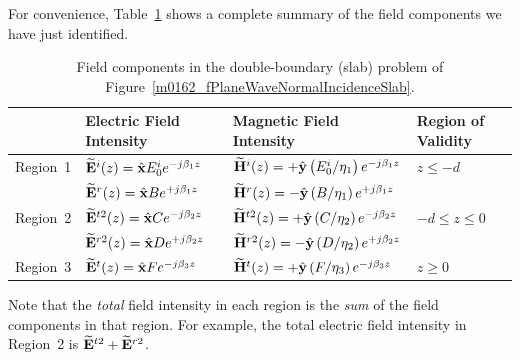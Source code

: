 For convenience, Table~\ref{m0162_tFieldComponents} shows a complete summary of the field components we have just identified. 
%
\begin{table}[t] %
\begin{center}
\begin{tabular}{llll}
         & Electric Field Intensity & Magnetic Field Intensity & Region of Validity \\
\hline\hline
Region~1 & $\widetilde{\bf E}^i(z)    = \hat{\bf x} E_0^i e^{-j\beta_1 z}$    &  $\widetilde{\bf H}^i(z)    = +\hat{\bf y} \left(E_0^i/\eta_1\right) e^{-j\beta_1 z}$   &  $z \le -d$ \\
~        & $\widetilde{\bf E}^r(z)    = \hat{\bf x} B e^{+j\beta_1 z}$  &  $\widetilde{\bf H}^r(z)    = -\hat{\bf y} \left(B/\eta_1\right) e^{+j\beta_1 z}$ &  ~ \\
\hline
Region~2 & $\widetilde{\bf E}^{t2}(z) = \hat{\bf x} C e^{-j\beta_2 z}$  &  $\widetilde{\bf H}^{t2}(z) = +\hat{\bf y} \left(C/\eta_2\right) e^{-j\beta_2 z}$ &  $-d \le z \le 0$ \\
~        & $\widetilde{\bf E}^{r2}(z) = \hat{\bf x} D e^{+j\beta_2 z}$  &  $\widetilde{\bf H}^{r2}(z) = -\hat{\bf y} \left(D/\eta_2\right) e^{+j\beta_2 z}$ &  ~ \\
\hline
Region~3 & $\widetilde{\bf E}^t(z)    = \hat{\bf x} F e^{-j\beta_3 z}$  &  $\widetilde{\bf H}^t(z)    = +\hat{\bf y} \left(F/\eta_3\right) e^{-j\beta_3 z}$ &  $z \ge 0$
\end{tabular}
\end{center}
\caption{\label{m0162_tFieldComponents} Field components in the double-boundary (slab) problem of Figure~\ref{m0162_fPlaneWaveNormalIncidenceSlab}.}
\end{table}
%
Note that the \emph{total} field intensity in each region is the \emph{sum} of the field components in that region.
For example, the total electric field intensity in Region~2 is $\widetilde{\bf E}^{t2}+\widetilde{\bf E}^{r2}$.

